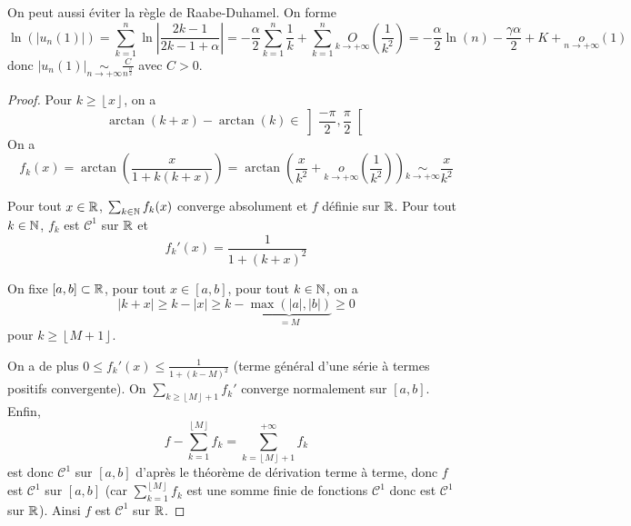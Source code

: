 \begin{remark}
    On peut aussi éviter la règle de Raabe-Duhamel. On forme 
    \begin{equation}
        \ln\left(\left\lvert u_{n}(1)\right\rvert\right)=\sum_{k=1}^{n}\ln\left\lvert\frac{2k-1}{2k-1+\alpha}\right\rvert=-\frac{\alpha}{2}\sum_{k=1}^{n}\frac{1}{k}+\sum_{k=1}^{n}\underset{k\to+\infty}{O}\left(\frac{1}{k^{2}}\right)=-\frac{\alpha}{2}\ln(n)-\frac{\gamma\alpha}{2}+K+\underset{n\to+\infty}{o}\left(1\right)
    \end{equation}
    donc $\left\lvert u_{n}(1)\right\rvert\underset{n\to+\infty}{\sim}\frac{C}{n^{\frac{\alpha}{2}}}$ avec $C>0$.
\end{remark}

\begin{proof}
    Pour $k\geqslant \left\lfloor x\right\rfloor$, on a 
    \begin{equation}
        \arctan(k+x)-\arctan(k)\in\left]\frac{-\pi}{2},\frac{\pi}{2}\right[
    \end{equation}
    On a 
    \begin{equation}
        f_{k}(x)=\arctan\left(\frac{x}{1+k(k+x)}\right)=\arctan\left(\frac{x}{k^{2}}+\underset{k\to+\infty}{o}\left(\frac{1}{k^{2}}\right)\right)\underset{k\to+\infty}{\sim}\frac{x}{k^{2}}
    \end{equation}

    Pour tout $x\in\mathbb{R}$, $\sum_{k\in\mathbb{N}}f_{k}(x)$ converge absolument et $f$ définie sur $\mathbb{R}$. Pour tout $k\in\mathbb{N}$, $f_{k}$ est $\mathcal{C}^{1}$ sur $\mathbb{R}$ et 
    \begin{equation}
        f_{k}'(x)=\frac{1}{1+(k+x)^{2}}
    \end{equation}

    On fixe $[a,b]\subset\mathbb{R}$, pour tout $x\in[a,b]$, pour tout $k\in\mathbb{N}$, on a \begin{equation}
        \left\lvert k+x\right\rvert\geqslant k-\left\lvert x\right\rvert \geqslant k-\underbrace{\max\left(\left\lvert a\right\rvert,\left\lvert b\right\rvert\right)}_{=M}\geqslant 0    
    \end{equation}
    pour $k\geqslant \left\lfloor M+1\right\rfloor$.

    On a de plus $0\leqslant f_{k}'(x)\leqslant \frac{1}{1+(k-M)^{2}}$ (terme général d'une série à termes positifs convergente). On $\sum_{k\geqslant\left\lfloor M\right\rfloor+1}f_{k}'$ converge normalement sur $[a,b]$. Enfin, 
    \begin{equation}
        f-\sum_{k=1}^{\left\lfloor M\right\rfloor}f_{k}=\sum_{k=\left\lfloor M\right\rfloor+1}^{+\infty}f_{k}
    \end{equation}
    est donc $\mathcal{C}^{1}$ sur $[a,b]$ d'après le théorème de dérivation terme à terme, donc $f$ est $\mathcal{C}^{1}$ sur $[a,b]$ (car $\sum_{k=1}^{\left\lfloor M\right\rfloor}f_{k}$ est une somme finie de fonctions $\mathcal{C}^{1}$ donc est $\mathcal{C}^{1}$ sur $\mathbb{R}$). Ainsi $f$ est $\mathcal{C}^{1}$ sur $\mathbb{R}$.


\end{proof}

